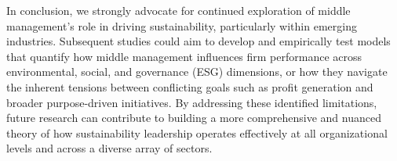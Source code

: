 	In conclusion, we strongly advocate for continued exploration of middle management's role in driving sustainability, particularly within emerging industries. Subsequent studies could aim to develop and empirically test models that quantify how middle management influences firm performance across environmental, social, and governance (ESG) dimensions, or how they navigate the inherent tensions between conflicting goals such as profit generation and broader purpose-driven initiatives. By addressing these identified limitations, future research can contribute to building a more comprehensive and nuanced theory of how sustainability leadership operates effectively at all organizational levels and across a diverse array of sectors.
	